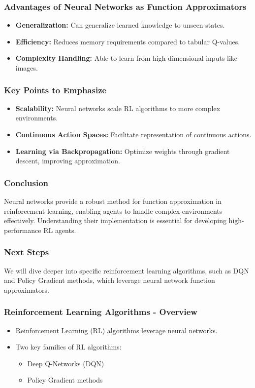 \documentclass[aspectratio=169]{beamer}
\begin{document}
\begin{frame}[fragile]
    \frametitle{Advantages of Neural Networks as Function Approximators}
    \begin{itemize}
        \item \textbf{Generalization:} Can generalize learned knowledge to unseen states.
        \item \textbf{Efficiency:} Reduces memory requirements compared to tabular Q-values.
        \item \textbf{Complexity Handling:} Able to learn from high-dimensional inputs like images.
    \end{itemize}
\end{frame}

\begin{frame}[fragile]
    \frametitle{Key Points to Emphasize}
    \begin{itemize}
        \item \textbf{Scalability:} Neural networks scale RL algorithms to more complex environments.
        \item \textbf{Continuous Action Spaces:} Facilitate representation of continuous actions.
        \item \textbf{Learning via Backpropagation:} Optimize weights through gradient descent, improving approximation.
    \end{itemize}
\end{frame}

\begin{frame}[fragile]
    \frametitle{Conclusion}
    Neural networks provide a robust method for function approximation in reinforcement learning, enabling agents to handle complex environments effectively. Understanding their implementation is essential for developing high-performance RL agents.
\end{frame}

\begin{frame}[fragile]
    \frametitle{Next Steps}
    We will dive deeper into specific reinforcement learning algorithms, such as DQN and Policy Gradient methods, which leverage neural network function approximators.
\end{frame}

\begin{frame}[fragile]
    \frametitle{Reinforcement Learning Algorithms - Overview}
    
    \begin{itemize}
        \item Reinforcement Learning (RL) algorithms leverage neural networks.
        \item Two key families of RL algorithms:
        \begin{itemize}
            \item Deep Q-Networks (DQN)
            \item Policy Gradient methods
        \end{itemize}
    \end{itemize}

\end{frame}
\end{document}
